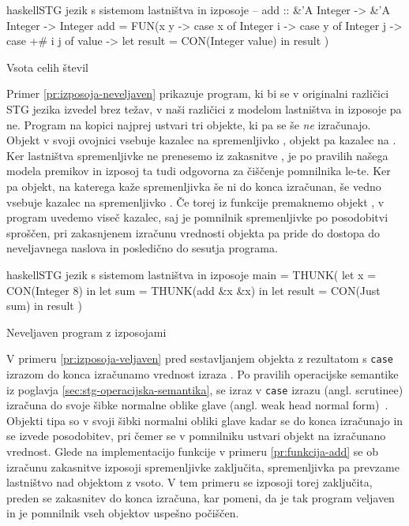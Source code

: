 \begin{primer}[ht]
\centering
\begin{code-box}{haskell}{STG jezik s sistemom lastništva in izposoje \cmark}
-- add :: &'A Integer -> &'A Integer -> Integer
add = FUN(x y -> 
    case x of {
        Integer i -> case y of {
            Integer j -> case +# i j of {
                value -> let result = CON(Integer value) in result
            }
        }
    }
)
\end{code-box}
\caption{Vsota celih števil}
\label{pr:funkcija-add}
\end{primer}

Primer \ref{pr:izposoja-neveljaven} prikazuje program, ki bi se v originalni različici STG jezika izvedel brez težav, v naši različici z modelom lastništva in izposoje pa ne. Program na kopici najprej ustvari tri objekte, ki pa se še \emph{ne} izračunajo. Objekt  v svoji ovojnici vsebuje kazalec na spremenljivko , objekt  pa kazalec na . Ker lastništva spremenljivke  ne prenesemo iz zakasnitve , je po pravilih našega modela premikov in izposoj ta tudi odgovorna za čiščenje pomnilnika le-te. Ker pa objekt, na katerega kaže spremenljivka  še ni do konca izračunan, še vedno vsebuje kazalec na spremenljivko . Če torej iz funkcije premaknemo objekt , v program uvedemo viseč kazalec, saj je pomnilnik spremenljivke  po posodobitvi sproščen, pri zakasnjenem izračunu vrednosti objekta  pa pride do dostopa do neveljavnega naslova in posledično do sesutja programa.

\begin{primer}[ht]
\centering
\begin{code-box}{haskell}{STG jezik s sistemom lastništva in izposoje \xmark}
main = THUNK(
    let x = CON(Integer 8) in
    let sum = THUNK(add &x &x) in
    let result = CON(Just sum) in
        result
)
\end{code-box}
\caption{Neveljaven program z izposojami}
\label{pr:izposoja-neveljaven}
\end{primer}

V primeru \ref{pr:izposoja-veljaven} pred sestavljanjem objekta  z rezultatom s \texttt{case} izrazom do konca izračunamo vrednost izraza . Po pravilih operacijske semantike iz poglavja \ref{sec:stg-operacijska-semantika}, se izraz v \texttt{case} izrazu (angl. scrutinee) izračuna do svoje šibke normalne oblike glave (angl. weak head normal form)~\cite{jones1992implementing}. Objekti tipa  so v svoji šibki normalni obliki glave kadar se do konca izračunajo in se izvede posodobitev, pri čemer se v pomnilniku ustvari objekt  na izračunano vrednost. Glede na implementacijo funkcije  v primeru \ref{pr:funkcija-add} se ob izračunu zakasnitve  izposoji spremenljivke  zaključita, spremenljivka  pa prevzame lastništvo nad objektom z vsoto. V tem primeru se izposoji torej zaključita, preden se zakasnitev  do konca izračuna, kar pomeni, da je tak program veljaven in je pomnilnik vseh objektov uspešno počiščen.

